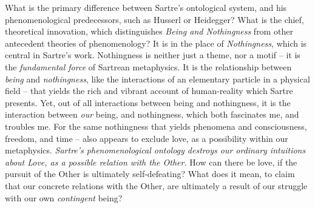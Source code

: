 What is the primary difference between Sartre's ontological system, and his phenomenological predecessors, such as Husserl or Heidegger? What is the chief, theoretical innovation, which distinguishes \emph{Being and Nothingness} from other antecedent theories of phenomenology? It is in the place of \emph{Nothingness}, which is central in Sartre's work. Nothingness is neither just a theme, nor a motif -- it is the \emph{fundamental force} of Sartrean metaphysics. It is the relationship between \emph{being} and \emph{nothingness}, like the interactions of an elementary particle in a physical field -- that yields the rich and vibrant account of human-reality which Sartre presents. Yet, out of all interactions between being and nothingness, it is the interaction between \emph{our} being, and nothingness, which both fascinates me, and troubles me.
For the same nothingness that yields phenomena and consciousness, freedom, and time -- also appears to exclude love, as a possibility within our metaphysics. \emph{Sartre's phenomenological ontology destroys our ordinary intuitions about Love, as a possible relation with the Other.} How can there be love, if the pursuit of the Other is ultimately self-defeating? What does it mean, to claim that our concrete relations with the Other, are ultimately a result of our struggle with our own \emph{contingent} being?

%

